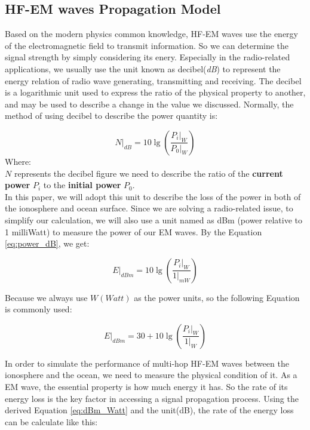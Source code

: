 \documentclass{mcmthesis}
\begin{document}
  \subsection{HF-EM waves Propagation Model}

    Based on the modern physics common knowledge, HF-EM waves use the energy of the electromagnetic field to transmit information. So we can determine the signal strength by simply considering its enery. Especially in the radio-related applications, we usually use the unit known as decibel(\emph{dB}) to represent the energy relation of radio wave generating, transmitting and receiving. The decibel is a logarithmic unit used to express the ratio of the physical property to another, and may be used to describe a change in the value we discussed. Normally, the method of using decibel to describe the power quantity is:

      \begin{equation}\label{eq:power_dB}
        N|_{dB} = 10 \lg(\frac{P_{i}|_{W}}{P_{0}|_{W}})
      \end{equation}
      Where: \\
      $N$ represents the decibel figure we need to describe the ratio of the \textbf{current power} $P_{i}$ to the \textbf{initial power} $P_{0}$.\\

    In this paper, we will adopt this unit to describe the loss of the power in both of the ionosphere and ocean surface. Since we are solving a radio-related issue, to simplify our calculation, we will also use a unit named as dBm (power relative to 1 milliWatt) to measure the power of our EM waves. By the Equation \ref{eq:power_dB}, we get:

      \begin{equation}\label{eq:dBm_milliWatt}
        E |_{dBm} = 10 \lg(\frac{P_{i}|_{W}}{1 |_{mW} })
      \end{equation}

    Because we always use $W(Watt)$ as the power units, so the following Equation is commonly used:

      \begin{equation}\label{eq:dBm_Watt}
        E |_{dBm} = 30 + 10 \lg(\frac{P_{i}|_{W}}{1 |_{W} })
      \end{equation}

    In order to simulate the performance of multi-hop HF-EM waves between the ionosphere and the ocean, we need to measure the physical condition of it. As a EM wave, the essential property is how much energy it has. So the rate of its energy loss is the key factor in accessing a signal propagation process. Using the derived Equation \ref{eq:dBm_Watt} and the unit(dB), the rate of the energy loss can be calculate like this:
\end{document}
